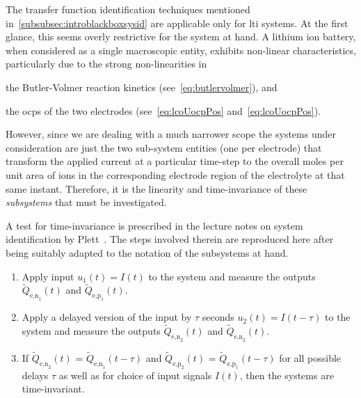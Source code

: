 The      transfer     function      identification     techniques      mentioned
in~\cref{subsubsec:introblackboxsysid}   are  applicable  only   for   \gls{lti}
systems.  At the  first glance,  this seems  overly restrictive  for the  system
at  hand.  A lithium  ion  battery,  when  considered  as a  single  macroscopic
entity,  exhibits non-linear  characteristics,  particularly due  to the  strong
non-linearities in
\begin{enumerate*}[label=\emph{\alph*})]
    \item the Butler-Volmer reaction kinetics (see~\cref{eq:butlervolmer}), and
    \item the \glspl{ocp} of the two electrodes (see~\cref{eq:lcoUocpPos} and~\cref{eq:lcoUocpPos}).
\end{enumerate*}
However, since we are dealing with a much narrower scope \ie{} the systems under
consideration  are just  the two  sub-system entities  (one per  electrode) that
transform the  applied current at  a particular  time-step to the  overall moles
per  unit area  of    ions in  the  corresponding  electrode region  of
the  electrolyte at  that  same  instant. Therefore,  it  is  the linearity  and
time-invariance of these \emph{subsystems} that must be investigated.

A  test  for time-invariance  is  prescribed  in  the  lecture notes  on  system
identification by  Plett~\cite{PlettECE5560_02}. The steps involved  therein are
reproduced here after  being suitably adapted to the notation  of the subsystems
at hand.
\begin{enumerate}
    \item Apply input $u_1(t) = I(t)$ to the system and measure the outputs $\widetilde{Q}_{\text{e,n}_1}(t)$ and $\widetilde{Q}_{\text{e,p}_1}(t)$.
    \item Apply a delayed version of the input by $\tau$ seconds \ie{} $u_2(t) = I(t-\tau)$ to the system and measure the outputs
        $\widetilde{Q}_{\text{e,n}_2}(t)$ and $\widetilde{Q}_{\text{e,n}_2}(t)$.
    \item If $\widetilde{Q}_{\text{e,n}_2}(t)$ = $\widetilde{Q}_{\text{e,n}_1}(t-\tau)$ and $\widetilde{Q}_{\text{e,p}_2}(t)$ = $\widetilde{Q}_{\text{e,p}_1}(t-\tau)$ for all possible delays $\tau$ as well as for choice of input signals $I(t)$, then the systems are time-invariant.
\end{enumerate}

